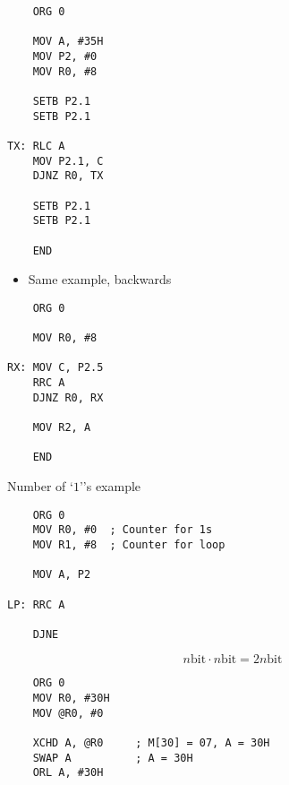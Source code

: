 \documentclass[12pt]{article}
\begin{document}
\begin{verbatim}
    ORG 0

    MOV A, #35H
    MOV P2, #0
    MOV R0, #8

    SETB P2.1
    SETB P2.1

TX: RLC A
    MOV P2.1, C
    DJNZ R0, TX

    SETB P2.1
    SETB P2.1

    END
\end{verbatim}

\begin{itemize}
    \item Same example, backwards
\end{itemize}

\begin{verbatim}
    ORG 0

    MOV R0, #8

RX: MOV C, P2.5
    RRC A
    DJNZ R0, RX

    MOV R2, A

    END
\end{verbatim}

 \begin{itemize}
    Number of `$1$''s example
 \end{itemize}

\begin{verbatim}
    ORG 0
    MOV R0, #0  ; Counter for 1s
    MOV R1, #8  ; Counter for loop

    MOV A, P2

LP: RRC A

    DJNE
\end{verbatim}


\begin{equation}
    n \text{bit} \cdot n \text{bit} = 2n \text{bit}
\end{equation}

\begin{verbatim}
    ORG 0
    MOV R0, #30H
    MOV @R0, #0

    XCHD A, @R0     ; M[30] = 07, A = 30H
    SWAP A          ; A = 30H
    ORL A, #30H
\end{verbatim}
\end{document}
